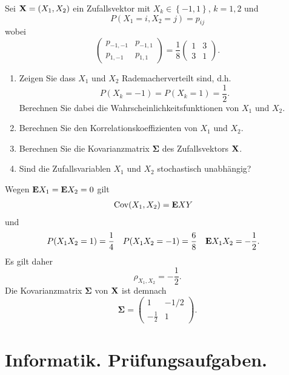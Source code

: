  Sei $\mathbf X = (X_1, X_2)$ ein Zufallsvektor mit
$X_k \in \left\{ -1, 1 \right\}$, $k=1,2$ und \[P(X_1=i, X_2=j)=p_{ij}\] wobei
\begin{equation*}
    \begin{pmatrix}
        p_{-1,-1} & p_{-1, 1} \\
        p_{1,-1} & p_{1,1}
    \end{pmatrix}
    = \frac{1}{8}
    \begin{pmatrix}
        1 & 3 \\
        3 & 1
    \end{pmatrix}.
\end{equation*}
\begin{enumerate}
    \item Zeigen Sie dass $X_1$ und $X_2$ Rademacherverteilt sind, d.h.\ 
        \[P(X_k = -1) = P(X_k = 1) = \frac{1}{2}. \]
        Berechnen Sie dabei die Wahrscheinlichkeitsfunktionen von $X_1$ und $X_2$. 

    \item Berechnen Sie den Korrelationskoeffizienten von $X_1$ und $X_2$.
    \item Berechnen Sie die Kovarianzmatrix $\mathbf \Sigma$ des Zufallsvektors $\mathbf X$.
    \item Sind die Zufallsvariablen $X_1$ und $X_2$ stochastisch unabhängig?
\end{enumerate}

\solution 
Wegen $\mathbf{E} X_1 = \mathbf{E} X_2 = 0$ gilt
\begin{align*}
    \operatorname{Cov}(X_1, X_2) &= \mathbf{E} XY
\end{align*}
und
\begin{align*}
    P(X_{1} X_{2} = 1) &= \frac{1}{4} & 
    P(X_{1} X_{2} = -1) &= \frac{6}{8} &
    \mathbf{E} X_{1}X_{2} &= -\frac{1}{2}. 
\end{align*}
Es gilt daher 
\begin{equation*}
   \rho_{X_1,X_2} = -\frac{1}{2}.
\end{equation*}
Die Kovarianzmatrix $\mathbf \Sigma$ von $\mathbf X$ ist demnach
\begin{equation*}
    \mathbf \Sigma = \begin{pmatrix}
        1 & -1/2 \\
        -\frac{1}{2} & 1
    \end{pmatrix}.
\end{equation*}


\section{Informatik. Prüfungsaufgaben. }

